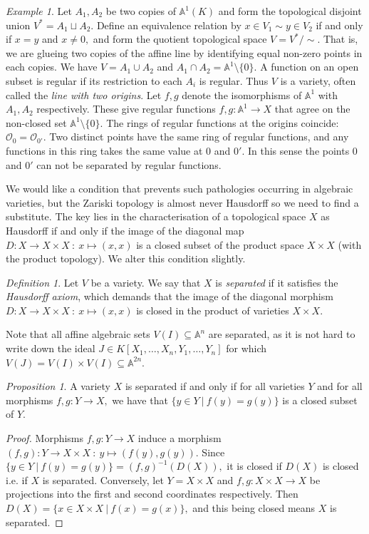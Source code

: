 \documentclass[BSc]{usydthesis}
\numberwithin{equation}{chapter}
\theoremstyle{remark}
\newtheorem{Definition}[equation]{Definition}
\newtheorem{Proposition}[equation]{Proposition}
\newtheorem{Example}[equation]{Example}
\begin{document}
\begin{Example}
 Let $A_1, A_2$ be two copies of $\mathbb{A}^1(K)$ and form the topological disjoint union $V^*= A_1 \sqcup A_2.$ Define an equivalence relation by $ x \in V_1 \sim y \in V_2$ if and only if $x=y$ and $x\neq 0,$ and form the quotient topological space $V=V^*/\sim.$ That is, we are glueing two copies of the affine line by identifying equal non-zero points in each copies. We have $V = A_1 \cup A_2$ and $A_1 \cap A_2 = \mathbb{A}^1\setminus\{0\}.$ A function on an open subset is regular if its restriction to each $A_i$ is regular. Thus $V$ is a variety, often called the {\em line with two origins}. Let $f,g$ denote the isomorphisms of $\mathbb{A}^1$ with $A_1, A_2$ respectively. These give regular functions $f,g: \mathbb{A}^1 \to X$ that agree on the non-closed set $\mathbb{A}^1\setminus \{ 0 \}.$ The rings of regular functions at the origins coincide: $\mathcal{O}_{0} = \mathcal{O}_{0'}.$ Two distinct points have the same ring of regular functions, and any functions in this ring takes the same value at $0$ and $0'.$ In this sense the points $0$ and $0'$ can not be separated by regular functions.
\end{Example}

We would like a condition that prevents such pathologies occurring in algebraic varieties, but the Zariski topology is almost never Hausdorff so we need to find a substitute. The key lies in the characterisation of a topological space $X$ as Hausdorff if and only if the image of the diagonal map $D:X\to X\times X \ : \ x\mapsto (x,x)$ is a closed subset of the product space $X\times X$ (with the product topology). We alter this condition slightly.

\begin{Definition}
 Let $V$ be a variety. We say that $X$ is {\em separated} if it satisfies the {\em Hausdorff axiom}, which demands that the image of the diagonal morphism $D:X\to X \times X \ : \ x\mapsto (x,x)$ is closed in the product of varieties $X\times X.$ 
\end{Definition}
Note that all affine algebraic sets $V(I)\subseteq \mathbb{A}^n$ are separated, as it is not hard to write down the ideal $J\in K[X_1,\ldots, X_n, Y_1,\ldots, Y_n]$ for which $V(J) = V(I) \times V(I) \subseteq \mathbb{A}^{2n}.$ 

\begin{Proposition}
 A variety $X$ is separated if and only if for all varieties $Y$ and for all morphisms $f,g:Y\to X,$ we have that $\{ y\in Y \ | \ f(y)=g(y) \}$ is a closed subset of $Y.$
\end{Proposition}
\begin{proof}
 Morphisms $f,g:Y\to X$ induce a morphism $(f,g):Y \to X \times X \ : \ y \mapsto ( f(y), g(y) ).$ Since $\{ y\in Y \ | \ f(y)=g(y) \} = (f,g)^{-1} ( D(X)),$ it is closed if $D(X)$ is closed i.e. if $X$ is separated. Conversely, let $Y=X\times X$ and $f,g:X\times X \to X$ be projections into the first and second coordinates respectively. Then $D(X) = \{ x\in X\times X \ | \ f(x)=g(x) \},$ and this being closed means $X$ is separated. 
\end{proof}
\end{document}
